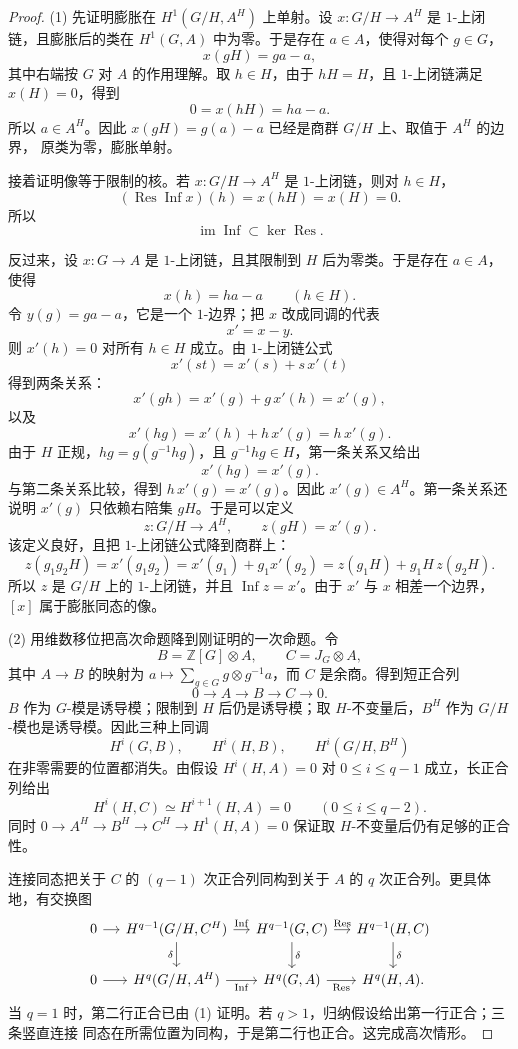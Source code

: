 \documentclass[11pt,a4paper,openany]{ctexbook}
\numberwithin{equation}{chapter}
\newcommand{\Z}{\mathbb{Z}}
\theoremstyle{plain}
\theoremstyle{definition}
\theoremstyle{remark}
\begin{document}
\begin{proof}
(1) 先证明膨胀在 $H^1(G/H,A^H)$ 上单射。设
$x:G/H\to A^H$ 是 $1$-上闭链，且膨胀后的类在 $H^1(G,A)$ 中为零。于是存在
$a\in A$，使得对每个 $g\in G$，
\[
 x(gH)=ga-a,
\]
其中右端按 $G$ 对 $A$ 的作用理解。取 $h\in H$，由于 $hH=H$，且 $1$-上闭链满足
$x(H)=0$，得到
\[
0=x(hH)=ha-a.
\]
所以 $a\in A^H$。因此 $x(gH)=g(a)-a$ 已经是商群 $G/H$ 上、取值于 $A^H$ 的边界，
原类为零，膨胀单射。

接着证明像等于限制的核。若 $x:G/H\to A^H$ 是 $1$-上闭链，则对 $h\in H$，
\[
(\operatorname{Res}\operatorname{Inf}x)(h)=x(hH)=x(H)=0.
\]
所以
\[
\operatorname{im}\operatorname{Inf}\subset\ker\operatorname{Res}.
\]

反过来，设 $x:G\to A$ 是 $1$-上闭链，且其限制到 $H$ 后为零类。于是存在 $a\in A$，
使得
\[
x(h)=ha-a\qquad(h\in H).
\]
令 $y(g)=ga-a$，它是一个 $1$-边界；把 $x$ 改成同调的代表
\[
x'=x-y.
\]
则 $x'(h)=0$ 对所有 $h\in H$ 成立。由 $1$-上闭链公式
\[
x'(st)=x'(s)+s\,x'(t)
\]
得到两条关系：
\[
x'(gh)=x'(g)+g\,x'(h)=x'(g),
\]
以及
\[
x'(hg)=x'(h)+h\,x'(g)=h\,x'(g).
\]
由于 $H$ 正规，$hg=g(g^{-1}hg)$，且 $g^{-1}hg\in H$，第一条关系又给出
\[
x'(hg)=x'(g).
\]
与第二条关系比较，得到 $h\,x'(g)=x'(g)$。因此 $x'(g)\in A^H$。第一条关系还说明
$x'(g)$ 只依赖右陪集 $gH$。于是可以定义
\[
z:G/H\to A^H,\qquad z(gH)=x'(g).
\]
该定义良好，且把 $1$-上闭链公式降到商群上：
\[
z(g_1g_2H)
=x'(g_1g_2)
=x'(g_1)+g_1x'(g_2)
=z(g_1H)+g_1H\,z(g_2H).
\]
所以 $z$ 是 $G/H$ 上的 $1$-上闭链，并且 $\operatorname{Inf}z=x'$。由于 $x'$ 与 $x$
相差一个边界，$[x]$ 属于膨胀同态的像。

(2) 用维数移位把高次命题降到刚证明的一次命题。令
\[
B=\Z[G]\otimes A,\qquad C=J_G\otimes A,
\]
其中 $A\to B$ 的映射为 $a\mapsto\sum_{g\in G}g\otimes g^{-1}a$，而 $C$ 是余商。得到短正合列
\[
0\to A\to B\to C\to0.
\]
$B$ 作为 $G$-模是诱导模；限制到 $H$ 后仍是诱导模；取 $H$-不变量后，$B^H$ 作为
$G/H$-模也是诱导模。因此三种上同调
\[
H^i(G,B),\qquad H^i(H,B),\qquad H^i(G/H,B^H)
\]
在非零需要的位置都消失。由假设 $H^i(H,A)=0$ 对 $0\le i\le q-1$ 成立，长正合列给出
\[
H^i(H,C)\simeq H^{i+1}(H,A)=0\qquad(0\le i\le q-2).
\]
同时 $0\to A^H\to B^H\to C^H\to H^1(H,A)=0$ 保证取 $H$-不变量后仍有足够的正合性。

连接同态把关于 $C$ 的 $(q-1)$ 次正合列同构到关于 $A$ 的 $q$ 次正合列。更具体地，有交换图
\[
\begin{tikzcd}[column sep=small]
0\arrow[r]&
H^{q-1}(G/H,C^H)\arrow[r,"\operatorname{Inf}"]\arrow[d,"\delta"']&
H^{q-1}(G,C)\arrow[r,"\operatorname{Res}"]\arrow[d,"\delta"]&
H^{q-1}(H,C)\arrow[d,"\delta"]\\
0\arrow[r]&
H^q(G/H,A^H)\arrow[r,"\operatorname{Inf}"']&
H^q(G,A)\arrow[r,"\operatorname{Res}"']&
H^q(H,A).
\end{tikzcd}
\]
当 $q=1$ 时，第二行正合已由 (1) 证明。若 $q>1$，归纳假设给出第一行正合；三条竖直连接
同态在所需位置为同构，于是第二行也正合。这完成高次情形。
\end{proof}
\end{document}
